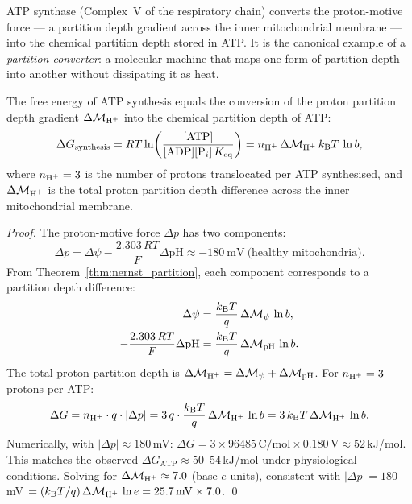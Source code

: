 ATP synthase (Complex~V of the respiratory chain) converts the
proton-motive force --- a partition depth gradient across the inner
mitochondrial membrane --- into the chemical partition depth stored in ATP.
It is the canonical example of a \emph{partition converter}: a molecular
machine that maps one form of partition depth into another without dissipating
it as heat.

\begin{theorem}
\label{thm:atp_synthesis}
The free energy of ATP synthesis equals the conversion of the proton partition
depth gradient $\Delta\Depth_{\ce{H+}}$ into the chemical partition depth of
ATP:
\begin{equation}
  \Delta G_{\mathrm{synthesis}}
    = RT\ln\!\left(\frac{[\mathrm{ATP}]}{[\mathrm{ADP}][\mathrm{P}_i]\,K_{\mathrm{eq}}}\right)
    = n_{\ce{H+}}\,\Delta\Depth_{\ce{H+}}\,\kB T\,\ln b,
  \label{eq:atp_synthesis}
\end{equation}
where $n_{\ce{H+}} = 3$ is the number of protons translocated per ATP
synthesised, and $\Delta\Depth_{\ce{H+}}$ is the total proton partition depth
difference across the inner mitochondrial membrane.
\end{theorem}

\begin{proof}
The proton-motive force $\Delta p$ has two components:
\begin{equation}
  \Delta p = \Delta\psi - \frac{2.303\,RT}{F}\Delta\mathrm{pH}
           \approx -180\ \mathrm{mV}\ \text{(healthy mitochondria)}.
  \label{eq:pmf}
\end{equation}
From Theorem~\ref{thm:nernst_partition}, each component corresponds to a
partition depth difference:
\begin{align}
  \Delta\psi &= \frac{k_{\mathrm{B}} T}{q}\,\Delta\mathcal{M}_\psi\,\ln b, \\
  -\frac{2.303\,RT}{F}\Delta\mathrm{pH}
    &= \frac{k_{\mathrm{B}} T}{q}\,\Delta\mathcal{M}_{\mathrm{pH}}\,\ln b.
\end{align}
The total proton partition depth is
$\Delta\Depth_{\ce{H+}} = \Delta\Depth_\psi + \Delta\Depth_{\mathrm{pH}}$.
For $n_{\ce{H+}} = 3$ protons per ATP:
\begin{equation}
  \Delta G = n_{\ce{H+}} \cdot q \cdot |\Delta p|
    = 3\,q\cdot\frac{\kB T}{q}\,\Delta\Depth_{\ce{H+}}\,\ln b
    = 3\,\kB T\,\Delta\Depth_{\ce{H+}}\,\ln b.
\end{equation}
Numerically, with $|\Delta p| \approx 180$\,mV:
$\Delta G = 3 \times 96485\,\mathrm{C/mol} \times 0.180\,\mathrm{V}
 \approx 52$\,kJ/mol.
This matches the observed $\Delta G_{\mathrm{ATP}} \approx 50$--$54$\,kJ/mol
under physiological conditions. Solving for
$\Delta\Depth_{\ce{H+}} \approx 7.0$ (base-$e$ units),
consistent with $|\Delta p| = 180$\,mV $= (\kB T/q)\,\Delta\Depth_{\ce{H+}}\,\ln e = 25.7\,\mathrm{mV}\times 7.0$. \qed
\end{proof}


